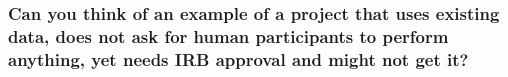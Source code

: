 \documentclass[12pt]{beamer}
\begin{document}
\begin{frame}

\frametitle{ Can you think of an example of a project that uses existing data, does not ask for human participants to perform anything, yet needs IRB approval and might not get it?
}









\end{frame} 
\end{document}
